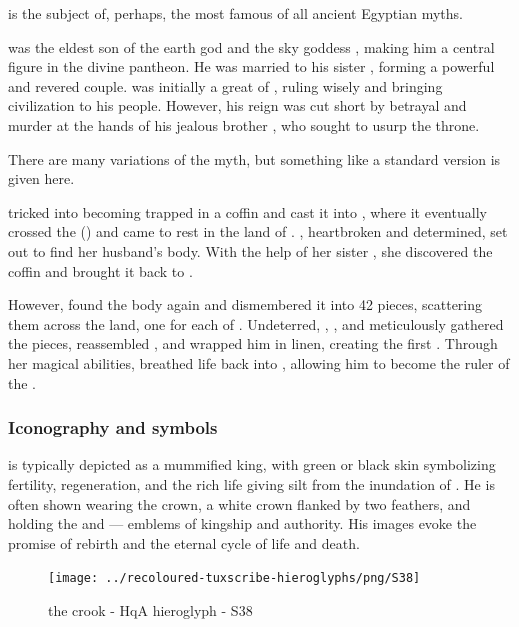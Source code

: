  is the subject of, perhaps, the most famous of all ancient Egyptian myths.

 was the eldest son of the earth god  and the sky goddess , making him a central figure in the divine pantheon. He was married to his sister , forming a powerful and revered couple.  was initially a great  of , ruling wisely and bringing civilization to his people. However, his reign was cut short by betrayal and murder at the hands of his jealous brother , who sought to usurp the throne.

There are many variations of the myth, but something like a standard version is given here.

 tricked  into becoming trapped in a coffin and cast it into , where it eventually crossed the  () and came to rest in the land of . , heartbroken and determined, set out to find her husband's body. With the help of her sister , she discovered the coffin and brought it back to .

However,  found the body again and dismembered it into 42 pieces, scattering them across the land, one for each  of . Undeterred, , , and  meticulously gathered the pieces, reassembled , and wrapped him in linen, creating the first . Through her magical abilities,  breathed life back into , allowing him to become the ruler of the .

\subsubsection*{Iconography and symbols}

 is typically depicted as a mummified king, with green or black skin symbolizing fertility, regeneration, and the rich life giving silt from the inundation of . He is often shown wearing the  crown, a white crown flanked by two  feathers, and holding the  and  — emblems of kingship and authority. His images evoke the promise of rebirth and the eternal cycle of life and death.

\begin{figure} [H]
	\centering
	\texttt{[image: ../recoloured-tuxscribe-hieroglyphs/png/S38]}
	\caption{the crook - HqA hieroglyph - S38}
\end{figure}

